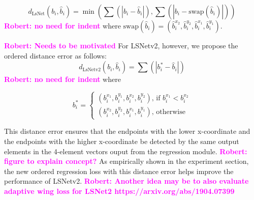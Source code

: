 \documentclass[journal]{IEEEtran}
\newcommand{\commentM}[1]{\textbf{\textcolor{blue}{M: #1}}}
\newcommand{\commentR}[1]{\textbf{\textcolor{magenta}{Robert: #1}}}
\begin{document}
\begin{equation}
  d_{\text{LsNet}}(b_i, \hat{b}_i) = \min(\sum (|b_i - \hat{b}_i|), \sum(|b_i - \text{swap}(\hat{b}_i)|))
\end{equation}
\commentR{no need for indent}
where $\text{swap}(\hat{b}_i) = (\hat{b}_i^{x_2}, \hat{b}_i^{y_2}, \hat{b}_i^{x_1}, \hat{b}_i^{y_1})$.

\commentR{Needs to be motivated} For LSNetv2, however, we propose the ordered distance error as follows:
\begin{equation}
  d_{\text{LsNetv2}}(b_i, \hat{b}_i) = \sum (|b^*_i - \hat{b}_i|)
\end{equation}
\commentR{no need for indent}
where 

\begin{equation}
  b^*_i=
    \begin{cases}
       (b_i^{x_1}, b_i^{y_1}, b_i^{x_2}, b_i^{y_2}) \text{, if } b_i^{x_1} < b_i^{x_2} \\
       (b_i^{x_2}, b_i^{y_2}, b_i^{x_1}, b_i^{y_1}) \text{, otherwise }
    \end{cases}       
\end{equation}

This distance error ensures that the endpoints with the lower x-coordinate and the endpoints with the higher x-coordinate be detected by the same output elements in the 4-element vectors ouput from the regression module. \commentR{figure to explain concept?} As empirically shown in the experiment section, the new ordered regression loss with this distance error helps improve the performance of LSNetv2. \commentR{Another idea may be to also evaluate adaptive wing loss for LSNet2 https://arxiv.org/abs/1904.07399}




\end{document}
